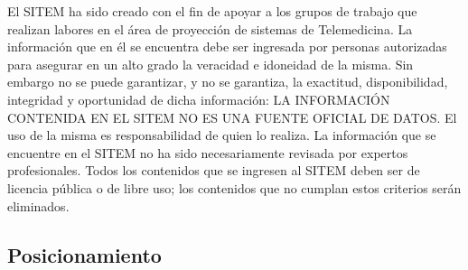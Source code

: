 El SITEM ha sido creado con el fin de apoyar a los grupos de trabajo que realizan labores en el área de proyección de sistemas de Telemedicina. La información que en él se encuentra debe ser ingresada por personas autorizadas para asegurar en un alto grado la veracidad e idoneidad de la misma. Sin embargo no se puede garantizar, y no se garantiza, la exactitud, disponibilidad, integridad y oportunidad de dicha información: LA INFORMACIÓN CONTENIDA EN EL SITEM NO ES UNA FUENTE OFICIAL DE DATOS. El uso de la misma es responsabilidad de quien lo realiza. La información que se encuentre en el SITEM no ha sido necesariamente revisada por expertos profesionales. Todos los contenidos que se ingresen al SITEM deben ser de licencia pública o de libre uso; los contenidos que no cumplan estos criterios serán eliminados.

\subsection{Posicionamiento}

